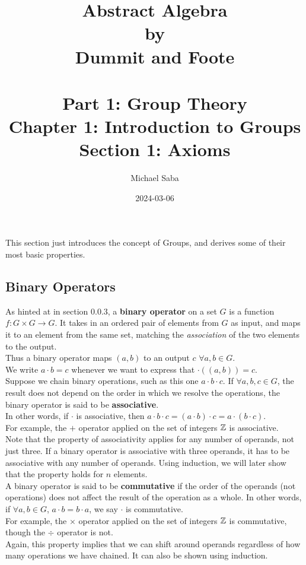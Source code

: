 \documentclass[12pt]{article}
\title{%
    \Huge Abstract Algebra \\
    \large by \\
    \Large Dummit and Foote \\~\\
    \huge Part 1: Group Theory \\
    \LARGE Chapter 1: Introduction to Groups \\
    \Large Section 1: Axioms
}
\date{2024-03-06}
\author{Michael Saba}
\begin{document}
    \maketitle
    \newpage
    \setlength{\parindent}{0pt}

    This section just introduces the concept of Groups,
    and derives some of their most basic properties. \\

    \subsection*{Binary Operators}
    
    As hinted at in section 0.0.3,
    a \textbf{binary operator} on a set $G$ is a function
    $f: G \times G \rightarrow G$.
    It takes in an ordered pair of elements from $G$ as input,
    and maps it to an element from the same set,
    matching the \textit{association} of the two elements to the output. \\
    Thus a binary operator maps $(a, b)$
    to an output $c$ $\forall a, b \in G$. \\
    We write $a \cdot b = c$ whenever we want to express that 
    $\cdot((a, b)) = c$. \\

    Suppose we chain binary operations,
    such as this one $a \cdot b \cdot c$.
    If $\forall a, b, c \in G$,
    the result does not depend on the order
    in which we resolve the operations,
    the binary operator is said to be \textbf{associative}. \\
    In other words, if $\cdot$ is associative,
    then
    $a \cdot b \cdot c = (a \cdot b) \cdot c = a \cdot (b \cdot c)$. \\
    For example,
    the $+$ operator applied on the set of integers $\mathbb{Z}$
    is associative. \\
    Note that the property of associativity
    applies for any number of operands,
    not just three.
    If a binary operator is associative with three operands,
    it has to be associative with any number of operands.
    Using induction,
    we will later show that the property holds for $n$ elements. \\

    A binary operator is said to be \textbf{commutative}
    if the order of the operands (not operations) does not affect
    the result of the operation as a whole.
    In other words, if $\forall a, b \in G$,
    $a \cdot b = b \cdot a$,
    we say $\cdot$ is commutative. \\
    For example,
    the $\times$ operator applied on the set of integers $\mathbb{Z}$
    is commutative,
    though the $\div$ operator is not. \\
    Again, this property implies that we can shift around operands
    regardless of how many operations we have chained.
    It can also be shown using induction. \\
\end{document}
